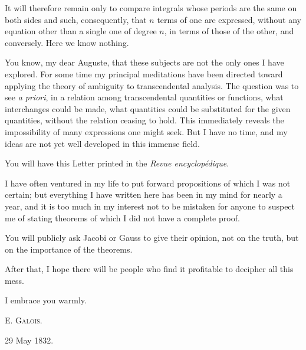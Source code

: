 
It will therefore remain only to compare integrals whose periods are
the same on both sides and such, consequently, that $n$ terms of one
are expressed, without any equation other than a single one of degree
$n$, in terms of those of the other, and conversely. Here we know
nothing.

\medskip

You know, my dear Auguste, that these subjects are not the only ones I
have explored. For some time my principal meditations have been directed
toward applying the theory of ambiguity to transcendental analysis. The
question was to see \emph{a priori}, in a relation among transcendental
quantities or functions, what interchanges could be made, what quantities
could be substituted for the given quantities, without the relation
ceasing to hold. This immediately reveals the impossibility of many
expressions one might seek. But I have no time, and my ideas are not yet
well developed in this immense field.

You will have this Letter printed in the \emph{Revue encyclopédique}.

I have often ventured in my life to put forward propositions of which I
was not certain; but everything I have written here has been in my mind
for nearly a year, and it is too much in my interest not to be mistaken
for anyone to suspect me of stating theorems of which I did not have a
complete proof.

You will publicly ask Jacobi or Gauss to give their opinion, not on the
truth, but on the importance of the theorems.

After that, I hope there will be people who find it profitable to
decipher all this mess.

I embrace you warmly.

\noindent\hfill\textsc{E. Galois.}\hspace{2.5em}\par
\vspace{0.15em}
\noindent\hspace{2.2em}29 May 1832.\par

\GalArticleEndRule

